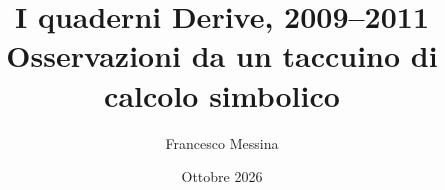 \documentclass[11pt,a4paper]{article}
\title{\sffamily\bfseries\color{blunotte}I quaderni Derive, 2009--2011\\[6pt]\large\mdseries\color{inchiostro}Osservazioni da un taccuino di calcolo simbolico}
\author{Francesco Messina}
\date{Ottobre 2026}
\begin{document}
\maketitle

\begin{abstract}

\end{abstract}












\appendix



\end{document}
